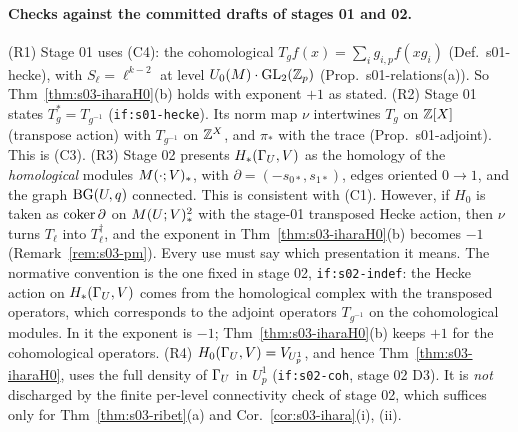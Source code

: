 \paragraph{Checks against the committed drafts of stages 01 and 02.}
(R1) Stage 01 uses (C4): the cohomological $T_gf(x)=\sum_ig_{i,p}f(xg_i)$ (Def.~s01-hecke), with $S_\ell=\ell^{k-2}$ at level
$U_0(M)\cdot\mathrm{GL}_2(\mathbb{Z}_p)$ (Prop.~s01-relations(a)). So Thm~\ref{thm:s03-iharaH0}(b) holds with exponent $+1$ as stated. (R2) Stage 01
states $T_g^*=T_{g^{-1}}$ (\texttt{if:s01-hecke}). Its norm map $\nu$ intertwines $T_g$ on $\mathbb{Z}[X]$ (transpose action) with $T_{g^{-1}}$
on $\mathbb{Z}^X$, and $\pi_*$ with the trace (Prop.~s01-adjoint). This is (C3). (R3) Stage 02 presents $H_*(\Gamma_U,V)$ as the homology of the
\emph{homological} modules $M(\cdot;V)_*$, with $\partial=(-s_{0*},s_{1*})$, edges oriented $0\to1$, and the graph $\mathrm{BG}(U,q)$
connected. This is consistent with (C1). However, if $H_0$ is taken as $\operatorname{coker}\partial$ on $M(U;V)_*^2$ with the stage-01
transposed Hecke action, then $\nu$ turns $T_\ell$ into $T_\ell^\dagger$, and the exponent in Thm~\ref{thm:s03-iharaH0}(b) becomes
$-1$ (Remark~\ref{rem:s03-pm}). Every use must say which presentation it means. The normative convention is the one fixed in stage 02, \texttt{if:s02-indef}:
the Hecke action on $H_*(\Gamma_U,V)$ comes from the homological complex with the transposed operators, which corresponds to the adjoint operators $T_{g^{-1}}$ on the cohomological modules. In it the exponent is $-1$; Thm~\ref{thm:s03-iharaH0}(b) keeps $+1$ for the cohomological operators.
 (R4) $H_0(\Gamma_U,V)=V_{U^1_p}$, and hence
Thm~\ref{thm:s03-iharaH0}, uses the full density of $\Gamma_U$ in $U^1_p$ (\texttt{if:s02-coh}, stage 02 D3). It is \emph{not} discharged by
the finite per-level connectivity check of stage 02, which suffices only for Thm~\ref{thm:s03-ribet}(a) and
Cor.~\ref{cor:s03-ihara}(i), (ii).

